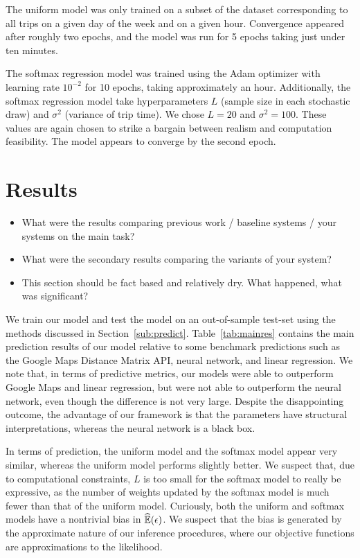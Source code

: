 \documentclass{article}
\begin{document}
The uniform model was only trained on a subset of the
dataset corresponding to all trips on a given day of the week and on a given
hour. Convergence appeared after roughly two epochs, and the model was run for 5
epochs taking just under ten minutes.

The softmax regression model was trained
using the Adam optimizer \cite{kingma2014adam} with learning rate $10^{-2}$ for 10 epochs,
taking approximately an hour. Additionally, the softmax regression model take hyperparameters $L$ (sample size in each stochastic draw) and $\sigma^2$ (variance of trip time). We chose $L = 20$ and $\sigma^2 = 100$. These values are again chosen to strike a bargain between realism and computation feasibility. The model appears to converge by the second epoch. 

\section{Results}

{\color{gray}\begin{itemize}
\item What were the results comparing previous work / baseline systems / your systems on the main task?
\item What were the secondary results comparing the variants of your system?
\item This section should be fact based and relatively dry. What happened, what was significant?
\end{itemize}
}

We train our model and test the model on an out-of-sample test-set using the methods discussed in Section~\ref{sub:predict}. Table~\ref{tab:mainres} contains the main prediction results of our model relative to some benchmark predictions
such as the Google Maps Distance Matrix API, neural network, and linear regression. We note that, in terms of predictive metrics, our models were able to outperform Google Maps and linear regression, but were not able to outperform the neural network, even though the difference is not very large. Despite the disappointing outcome, the advantage of our framework is that the parameters have structural interpretations, whereas the neural network is a black box. 

In terms of prediction, the uniform model and the softmax model appear very similar, whereas the uniform model performs slightly better. We suspect that, due to computational constraints, $L$ is too small for the softmax model to really be expressive, as the number of weights updated by the softmax model is much fewer than that of the uniform model. Curiously, both the uniform and softmax models have a nontrivial bias in $\widehat{\mathbb{E}}(\epsilon)$. We suspect that the bias is generated by the approximate nature of our inference procedures, where our objective functions are approximations to the likelihood.
\end{document}
